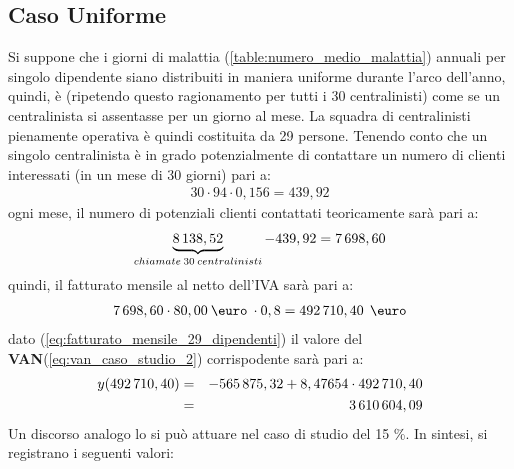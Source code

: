 \subsection[Caso Uniforme]{Caso Uniforme}
Si suppone che i giorni di malattia (\ref{table:numero_medio_malattia}) annuali per singolo dipendente siano distribuiti in maniera uniforme durante l'arco dell'anno, quindi, è (ripetendo questo ragionamento per tutti i 30 centralinisti) come se un centralinista si assentasse per un giorno al mese. \newline
La squadra di centralinisti pienamente operativa è quindi costituita da 29 persone. \newline
Tenendo conto che un singolo centralinista è in grado potenzialmente di contattare un numero di clienti interessati (in un mese di 30 giorni) pari a:
	\begin{equation}
	\label{eq:chiamate_1_dipendente}
	\begin{split}
		30 \cdot 94 \cdot 0,156 = 439,92
	\end{split}
	\end{equation}
ogni mese, il numero di potenziali clienti contattati teoricamente sarà pari a:
	\begin{equation}
	\label{eq:chiamate_29_dipendenti}
	\begin{split}
		\underbrace{8\thinspace 138,52}_{chiamate\: 30 \: centralinisti} - 439,92 = 7\thinspace 698,60
 	\end{split}
	\end{equation}
quindi, il fatturato mensile al netto dell'IVA sarà pari a:
	\begin{equation}
	\label{eq:fatturato_mensile_29_dipendenti}
	\begin{split}
		7\thinspace 698,60 \cdot 80,00 \:\mbox{\euro} \: \cdot 0,8 = 492\thinspace 710,40 \: \:\mbox{\euro}
 	\end{split}
	\end{equation}	
dato (\ref{eq:fatturato_mensile_29_dipendenti}) il valore del \textbf{\ac{VAN}}(\ref{eq:van_caso_studio_2}) corrispodente sarà pari a:
	\begin{eqnarray}
	\label{eq:van_fatturato_mensile_29_dipendenti}
		y(492\thinspace 710,40) & = & -565\thinspace 875,32 + 8,47654 \cdot 492\thinspace 710,40 \nonumber \\
								 & = & 3\thinspace 610\thinspace 604,09 
	\end{eqnarray}	
Un discorso analogo lo si può attuare nel caso di studio del 15 \%. \newline
In sintesi, si registrano i seguenti valori:
